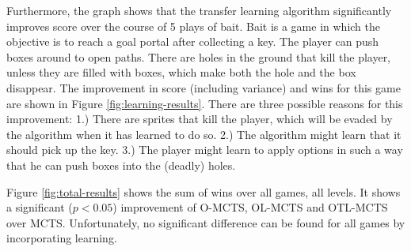 Furthermore, the graph shows that the transfer learning algorithm
significantly improves score over the course of 5 plays of bait. Bait is a game
in which the objective is to reach a goal portal after collecting a key. The
player can push boxes around to open paths. There are holes in the ground that
kill the player, unless they are filled with boxes, which make both the hole and
the box disappear. The improvement in score (including variance) and wins for
this game are shown in Figure \ref{fig:learning-results}. There are three
possible reasons for this improvement: 1.) There are sprites that kill the
player, which will be evaded by the algorithm when it has learned to do so.
2.) The algorithm might learn that it should pick up the key. 3.) The
player might learn to apply options in such a way that he can push boxes into the
(deadly) holes.

Figure \ref{fig:total-results} shows the sum of wins over all games, all levels.
It shows a significant ($p < 0.05$) improvement of O-MCTS, OL-MCTS and OTL-MCTS
over MCTS. Unfortunately, no significant difference can be found for all games
by incorporating learning.
